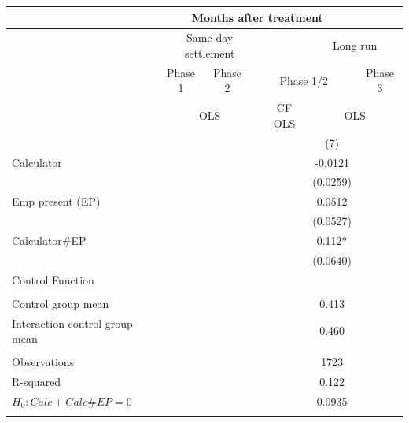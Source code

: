 \begin{tabular}{lcccccccc}
\toprule
\multicolumn{1}{|r}{} & \multicolumn{7}{c}{Months after treatment}            &  \\
\midrule
\multicolumn{1}{r|}{} & \multicolumn{5}{c}{Same day settlement} & \multicolumn{1}{c|}{} & \multicolumn{2}{c}{Long run} \\
\midrule
\midrule
\multicolumn{1}{r|}{} & \multicolumn{2}{c|}{Phase 1} & \multicolumn{2}{c|}{Phase 2} & \multicolumn{3}{c|}{Phase 1/2} & Phase 3 \\
\midrule
\multicolumn{1}{r|}{} & \multicolumn{5}{c|}{OLS}              & \multicolumn{1}{c|}{CF OLS} & \multicolumn{2}{c}{OLS} \\
\midrule
\midrule
      &       &       &       &       &       &       & (7)   &  \\
Calculator  &       &       &       &       &       &       & -0.0121 &  \\
      &       &       &       &       &       &       & (0.0259) &  \\
Emp present (EP) &       &       &       &       &       &       & 0.0512 &  \\
      &       &       &       &       &       &       & (0.0527) &  \\
Calculator\#EP &       &       &       &       &       &       & 0.112* &  \\
      &       &       &       &       &       &       & (0.0640) &  \\
Control Function &       &       &       &       &       &       &       &  \\
      &       &       &       &       &       &       &       &  \\
\midrule
Control group mean &       &       &       &       &       &       & 0.413 &  \\
Interaction control group mean &       &       &       &       &       &       & 0.460 &  \\
\midrule
      &       &       &       &       &       &       &       &  \\
\midrule
Observations &       &       &       &       &       &       & 1723  &  \\
R-squared &       &       &       &       &       &       & 0.122 &  \\
$H_0 : Calc + Calc\# EP = 0$ &       &       &       &       &       &       & 0.0935 &  \\
\midrule
\midrule
      &       &       &       &       &       &       &       &  \\
\midrule
\midrule
\end{tabular}%
